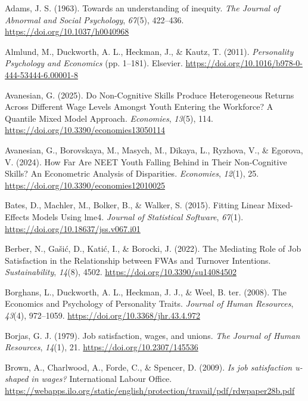 \documentclass[
]{interact}
\newlength{\cslhangindent}
\newenvironment{CSLReferences}[2] %
 {\begin{list}{}{%
  \setlength{\itemindent}{0pt}
  \setlength{\leftmargin}{0pt}
  \setlength{\parsep}{0pt}
  \ifodd #1
   \setlength{\leftmargin}{\cslhangindent}
   \setlength{\itemindent}{-1\cslhangindent}
  \fi
  \setlength{\itemsep}{#2\baselineskip}}}
 {\end{list}}
\begin{document}
\label{refs}
\begin{CSLReferences}{1}{0}
Adams, J. S. (1963). Towards an understanding of inequity. \emph{The
Journal of Abnormal and Social Psychology}, \emph{67}(5), 422--436.
\url{https://doi.org/10.1037/h0040968}

Almlund, M., Duckworth, A. L., Heckman, J., \& Kautz, T. (2011).
\emph{Personality Psychology and Economics} (pp. 1--181). Elsevier.
\url{https://doi.org/10.1016/b978-0-444-53444-6.00001-8}

Avanesian, G. (2025). Do Non-Cognitive Skills Produce Heterogeneous
Returns Across Different Wage Levels Amongst Youth Entering the
Workforce? A Quantile Mixed Model Approach. \emph{Economies},
\emph{13}(5), 114. \url{https://doi.org/10.3390/economies13050114}

Avanesian, G., Borovskaya, M., Masych, M., Dikaya, L., Ryzhova, V., \&
Egorova, V. (2024). How Far Are NEET Youth Falling Behind in Their
Non-Cognitive Skills? An Econometric Analysis of Disparities.
\emph{Economies}, \emph{12}(1), 25.
\url{https://doi.org/10.3390/economies12010025}

Bates, D., Machler, M., Bolker, B., \& Walker, S. (2015). Fitting Linear
Mixed-Effects Models Using lme4. \emph{Journal of Statistical Software},
\emph{67}(1). \url{https://doi.org/10.18637/jss.v067.i01}

Berber, N., Gašić, D., Katić, I., \& Borocki, J. (2022). The Mediating
Role of Job Satisfaction in the Relationship between FWAs and Turnover
Intentions. \emph{Sustainability}, \emph{14}(8), 4502.
\url{https://doi.org/10.3390/su14084502}

Borghans, L., Duckworth, A. L., Heckman, J. J., \& Weel, B. ter. (2008).
The Economics and Psychology of Personality Traits. \emph{Journal of
Human Resources}, \emph{43}(4), 972--1059.
\url{https://doi.org/10.3368/jhr.43.4.972}

Borjas, G. J. (1979). Job satisfaction, wages, and unions. \emph{The
Journal of Human Resources}, \emph{14}(1), 21.
\url{https://doi.org/10.2307/145536}

Brown, A., Charlwood, A., Forde, C., \& Spencer, D. (2009). \emph{Is job
satisfaction u-shaped in wages?} International Labour Office.
\url{https://webapps.ilo.org/static/english/protection/travail/pdf/rdwpaper28b.pdf}


\end{CSLReferences}
\end{document}
